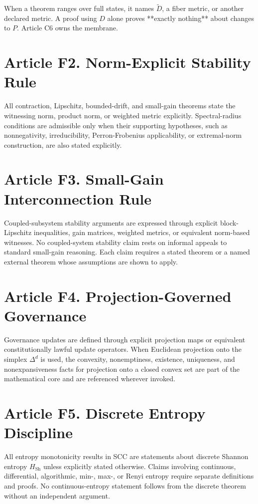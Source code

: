 \documentclass[10pt,oneside]{article}
\theoremstyle{definition}
\theoremstyle{remark}
\newcommand{\Sh}{\mathrm{Sh}}
\begin{document}
When a theorem ranges over full states, it names \(\widetilde{D}\), a fiber metric, or another declared metric. A proof using \(D\) alone proves **exactly nothing** about changes to \(P\). Article C6 owns the membrane.

\section{Article F2. Norm-Explicit Stability Rule}
All contraction, Lipschitz, bounded-drift, and small-gain theorems state the witnessing norm, product norm, or weighted metric explicitly. Spectral-radius conditions are admissible only when their supporting hypotheses, such as nonnegativity, irreducibility, Perron-Frobenius applicability, or extremal-norm construction, are also stated explicitly.

\section{Article F3. Small-Gain Interconnection Rule}
Coupled-subsystem stability arguments are expressed through explicit block-Lipschitz inequalities, gain matrices, weighted metrics, or equivalent norm-based witnesses. No coupled-system stability claim rests on informal appeals to standard small-gain reasoning. Each claim requires a stated theorem or a named external theorem whose assumptions are shown to apply.

\section{Article F4. Projection-Governed Governance}
Governance updates are defined through explicit projection maps or equivalent constitutionally lawful update operators. When Euclidean projection onto the simplex \(\Delta^d\) is used, the convexity, nonemptiness, existence, uniqueness, and nonexpansiveness facts for projection onto a closed convex set are part of the mathematical core and are referenced wherever invoked.

\section{Article F5. Discrete Entropy Discipline}
All entropy monotonicity results in SCC are statements about discrete Shannon entropy \(H_{\Sh}\) unless explicitly stated otherwise. Claims involving continuous, differential, algorithmic, min-, max-, or Renyi entropy require separate definitions and proofs. No continuous-entropy statement follows from the discrete theorem without an independent argument.
\end{document}
